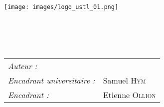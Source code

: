 
\begin{titlepage}

\begin{center}

\texttt{[image: images/logo\_ustl\_01.png]}\\[2.5cm]


\textsc{\Large \reportsubject}\\[0.5cm]
\HRule \\[0.4cm]
{\huge \reporttitle}\\[0.4cm]
\HRule \\[1.5cm]


\medskip

\begin{flushleft}
	\begin{tabular}{ll}
	\emph{Auteur :} & \reportauthor \\
	\emph{Encadrant universitaire :} & Samuel \textsc{Hym} \\
	\emph{Encadrant :} & Etienne \textsc{Ollion} \\
	\end{tabular}
\end{flushleft}


\end{center}
\end{titlepage}
